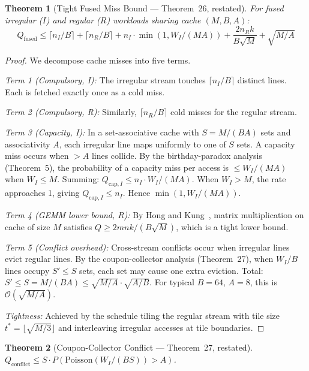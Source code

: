 \documentclass{article}
\newtheorem{theorem}{Theorem}
\theoremstyle{definition}
\theoremstyle{remark}
\newcommand{\BigO}{\mathcal{O}}
\newcommand{\ceil}[1]{\lceil #1 \rceil}
\newcommand{\floor}[1]{\lfloor #1 \rfloor}
\newcommand{\Qfused}{Q_{\mathrm{fused}}}
\begin{document}
\begin{theorem}[Tight Fused Miss Bound --- Theorem~26, restated]\label{thm:tight-fused-app}
For fused irregular ($I$) and regular ($R$) workloads sharing cache $(M, B, A)$:
\[
  \Qfused \leq \ceil{n_I/B} + \ceil{n_R/B} + n_I \cdot \min(1, W_I/(MA)) + \frac{2n_Rk}{B\sqrt{M}} + \sqrt{M/A}
\]
\end{theorem}

\begin{proof}
We decompose cache misses into five terms.

\emph{Term 1 (Compulsory, I):} The irregular stream touches $\ceil{n_I/B}$ distinct lines. Each is fetched exactly once as a cold miss.

\emph{Term 2 (Compulsory, R):} Similarly, $\ceil{n_R/B}$ cold misses for the regular stream.

\emph{Term 3 (Capacity, I):} In a set-associative cache with $S = M/(BA)$ sets and associativity $A$, each irregular line maps uniformly to one of $S$ sets. A capacity miss occurs when $>A$ lines collide. By the birthday-paradox analysis (Theorem~5), the probability of a capacity miss per access is $\leq W_I/(MA)$ when $W_I \leq M$. Summing: $Q_{\text{cap},I} \leq n_I \cdot W_I/(MA)$. When $W_I > M$, the rate approaches 1, giving $Q_{\text{cap},I} \leq n_I$. Hence $\min(1, W_I/(MA))$.

\emph{Term 4 (GEMM lower bound, R):} By Hong and Kung~\cite{hong1981io}, matrix multiplication on cache of size $M$ satisfies $Q \geq 2mnk/(B\sqrt{M})$, which is a tight lower bound.

\emph{Term 5 (Conflict overhead):} Cross-stream conflicts occur when irregular lines evict regular lines. By the coupon-collector analysis (Theorem~27), when $W_I/B$ lines occupy $S' \leq S$ sets, each set may cause one extra eviction. Total: $S' \leq S = M/(BA) \leq \sqrt{M/A} \cdot \sqrt{A/B}$. For typical $B=64$, $A=8$, this is $\BigO(\sqrt{M/A})$.

\emph{Tightness:} Achieved by the schedule tiling the regular stream with tile size $t^* = \floor{\sqrt{M/3}}$ and interleaving irregular accesses at tile boundaries.
\end{proof}

\begin{theorem}[Coupon-Collector Conflict --- Theorem~27, restated]\label{thm:coupon-app}
$Q_{\mathrm{conflict}} \leq S \cdot P(\mathrm{Poisson}(W_I/(BS)) > A)$.
\end{theorem}
\end{document}
